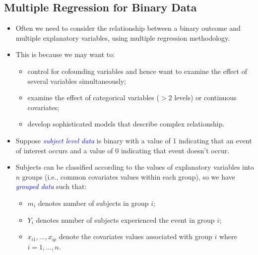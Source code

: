 \documentclass{article}\usepackage[]{graphicx}\usepackage[svgnames]{xcolor}
\begin{document}
\subsection*{Multiple Regression for Binary Data}
\begin{itemize}
      \item Often we need to consider the relationship between a binary outcome and
            multiple explanatory variables, using multiple regression methodology.
      \item This is because we may want to:
            \begin{itemize}
                  \item control for cofounding variables and hence want to examine the effect of
                        several variables simultaneously;
                  \item examine the effect of categorical variables ($ >2 $ levels) or continuous covariates;
                  \item develop sophisticated models that describe complex relationship.
            \end{itemize}
      \item Suppose \textcolor{Blue}{\emph{subject level data}} is binary with a value of 1 indicating that an event
            of interest occurs and a value of 0 indicating that event doesn't occur.
      \item Subjects can be classified according to the values of explanatory
            variables into $n$ groups (i.e., common covariates values within each group), so
            we have \textcolor{Blue}{\emph{grouped data}} such that:
            \begin{itemize}
                  \item $ m_i $ denotes number of subjects in group $i$;
                  \item $Y_i$ denotes number of subjects experienced the event in group $i$;
                  \item $ x_{i1},\ldots,x_{ip} $ denote the covariates values associated with group $i$
                        where $ i=1,\ldots,n $.
            \end{itemize}
\end{itemize}
\end{document}
